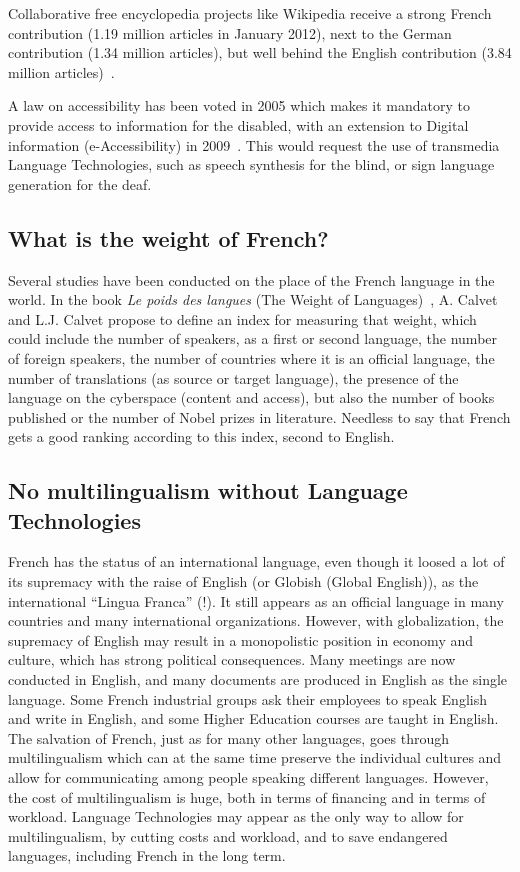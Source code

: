 \begin{multicols}{2}
Collaborative free encyclopedia projects like Wikipedia receive a
strong French contribution (1.19 million articles in January 2012),
next to the German contribution (1.34 million articles), but well behind the English contribution (3.84 million articles)~\cite{wikipediastats}.

A law on accessibility has been voted in 2005 which makes it mandatory
to provide access to information for the disabled, with an extension
to Digital information (e-Accessibility) in 2009~\cite{loi}. This would request
the use of transmedia Language Technologies, such as speech synthesis
for the blind, or sign language generation for the deaf.

\subsection{What is the weight of French?}

Several studies have been conducted on the place of the French
language in the world. In the book {\em Le poids des
langues} (The Weight of Languages)~\cite{calvet09}, A. Calvet and
L.J. Calvet propose to define an index for measuring that weight,
which could include the number of speakers, as a first or second
language, the number of foreign speakers, the number of countries
where it is an official language, the number of translations (as
source or target language), the presence of the language on the
cyberspace (content and access), but also the number of books
published or the number of Nobel prizes in literature. Needless to say
that French gets a good ranking according to this index, second to
English.

\subsection{No multilingualism without Language Technologies}

French has the status of an international language, even though it
loosed a lot of its supremacy with the raise of English (or Globish
(Global English)), as the international ``Lingua Franca'' (!). It still
appears as an official language in many countries and many
international organizations. However, with globalization, the
supremacy of English may result in a monopolistic position in economy
and culture, which has strong political consequences. Many meetings
are now conducted in English, and many documents are produced in
English as the single language. Some French industrial groups ask
their employees to speak English and write in English, and some Higher
Education courses are taught in English. The salvation of French, just
as for many other languages, goes through multilingualism which can at
the same time preserve the individual cultures and allow for
communicating among people speaking different languages. However, the
cost of multilingualism is huge, both in terms of financing and in
terms of workload. Language Technologies may appear as the only way to
allow for multilingualism, by cutting costs and workload, and to save
endangered languages, including French in the long term.


\end{multicols}
